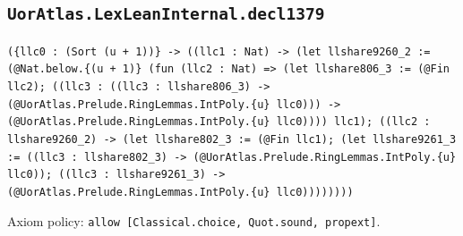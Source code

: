 \documentclass[11pt]{article}
\begin{document}
\subsection*{\texttt{UorAtlas.LexLeanInternal.decl1379}}
\noindent\texttt{(\{llc0 : (Sort (u + 1))\} -> ((llc1 : Nat) -> (let llshare9260\_2 := (@Nat.below.\{(u + 1)\} (fun (llc2 : Nat) => (let llshare806\_3 := (@Fin llc2); ((llc3 : ((llc3 : llshare806\_3) -> (@UorAtlas.Prelude.RingLemmas.IntPoly.\{u\} llc0))) -> (@UorAtlas.Prelude.RingLemmas.IntPoly.\{u\} llc0)))) llc1); ((llc2 : llshare9260\_2) -> (let llshare802\_3 := (@Fin llc1); (let llshare9261\_3 := ((llc3 : llshare802\_3) -> (@UorAtlas.Prelude.RingLemmas.IntPoly.\{u\} llc0)); ((llc3 : llshare9261\_3) -> (@UorAtlas.Prelude.RingLemmas.IntPoly.\{u\} llc0))))))))}\par
\noindent Axiom policy: \texttt{allow [Classical.choice, Quot.sound, propext]}.\par
\end{document}
